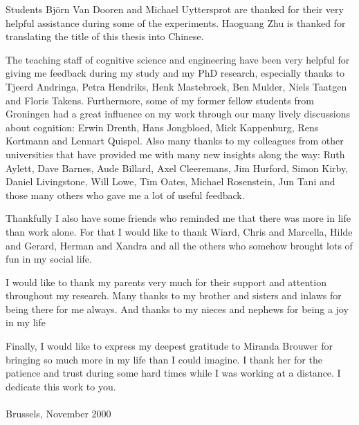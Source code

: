 Students Bj\"orn Van Dooren and Michael Uyttersprot are thanked for their very helpful assistance during some of the experiments. Haoguang Zhu is thanked for translating the title of this thesis into Chinese.

The teaching staff of cognitive science and engineering have been very helpful for giving me feedback during my study and my PhD research, especially thanks to Tjeerd Andringa, Petra Hendriks, Henk Mastebroek, Ben Mulder, Niels Taatgen and Floris Takens. Furthermore, some of my former fellow students from Groningen had a great influence on my work through our many lively discussions about cognition: Erwin Drenth, Hans Jongbloed, Mick Kappenburg, Rens Kortmann and Lennart Quispel. Also many thanks to my colleagues from other universities that have provided me with many new insights along the way: Ruth Aylett, Dave Barnes, Aude Billard, Axel Cleeremans, Jim Hurford, Simon Kirby, Daniel Livingstone, Will Lowe, Tim Oates, Michael Rosenstein, Jun Tani and those many others who gave me a lot of useful feedback.

Thankfully I also have some friends who reminded me that there was more in life than work alone. For that I would like to thank Wiard, Chris and Marcella, Hilde and Gerard, Herman and Xandra and all the others who somehow brought lots of fun in my social life.

I would like to thank my parents very much for their support and attention throughout my research. Many thanks to my brother and sisters and inlaws for being there for me always. And thanks to my nieces and nephews for being a joy in my life

Finally, I would like to express my deepest gratitude to Miranda Brouwer for bringing so much more in my life than I could imagine. I thank her for the patience and trust during some hard times while I was working at a distance. I dedicate this work to you.
\\
\\
\noindent Brussels, November 2000
